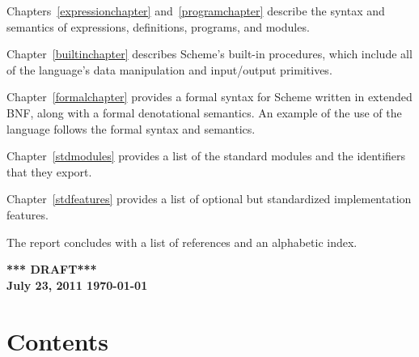 \vest Chapters~\ref{expressionchapter} and~\ref{programchapter} describe
the syntax and semantics of expressions, definitions, programs, and modules.

\vest Chapter~\ref{builtinchapter} describes Scheme's built-in
procedures, which include all of the language's data manipulation and
input/output primitives.

\vest Chapter~\ref{formalchapter} provides a formal syntax for Scheme
written in extended BNF, along with a formal denotational semantics.
An example of the use of the language follows the formal syntax and
semantics.

\vest Chapter~\ref{stdmodules} provides a list of the standard modules
and the identifiers that they export.

\vest Chapter~\ref{stdfeatures} provides a list of optional but standardized
implementation features.


\vest The report concludes with a list of references and an
alphabetic index.


\vfill
\begin{center}
{\large \bf
*** DRAFT*** \\
July 23, 2011
\today
}\end{center}

\vfill
\eject

\chapter*{Contents}
\addvspace{3.5pt}                  %
\renewcommand{\tocshrink}{-3.5pt}  %
{\footnotesize
\tableofcontents
}

\vfill
\eject

